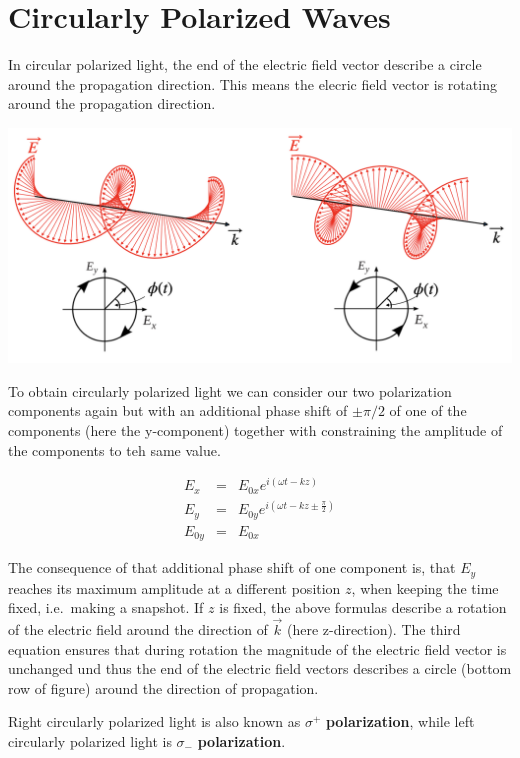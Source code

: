\documentclass[
  a4paper,
]{book}
\begin{document}
\section{Circularly Polarized Waves}\label{circularly-polarized-waves}

In circular polarized light, the end of the electric field vector
describe a circle around the propagation direction. This means the
elecric field vector is rotating around the propagation direction.

\includegraphics[width=0.9\linewidth,height=\textheight,keepaspectratio]{electromagnetic-waves/img/circular.png}

To obtain circularly polarized light we can consider our two
polarization components again but with an additional phase shift of
\(\pm\pi/2\) of one of the components (here the y-component) together
with constraining the amplitude of the components to teh same value.

\begin{eqnarray}
E_{x}&=&E_{0x}e^{i(\omega t-kz)}\\
E_{y}&=&E_{0y}e^{i(\omega t-kz\pm\frac{\pi}{2})}\\
E_{0y}&=&E_{0x}
\end{eqnarray}

The consequence of that additional phase shift of one component is, that
\(E_y\) reaches its maximum amplitude at a different position \(z\),
when keeping the time fixed, i.e.~making a snapshot. If \(z\) is fixed,
the above formulas describe a rotation of the electric field around the
direction of \(\vec{k}\) (here z-direction). The third equation ensures
that during rotation the magnitude of the electric field vector is
unchanged und thus the end of the electric field vectors describes a
circle (bottom row of figure) around the direction of propagation.

Right circularly polarized light is also known as \(\sigma^{+}\)
\textbf{polarization}, while left circularly polarized light is
\(\sigma_{-}\) \textbf{polarization}.
\end{document}
